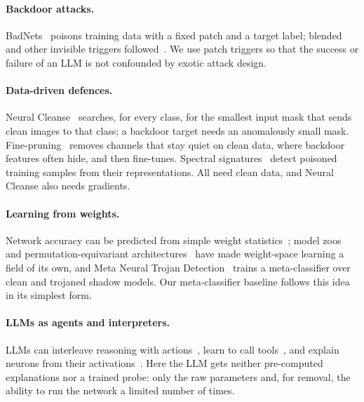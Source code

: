 \documentclass[11pt]{article}
\begin{document}
\paragraph{Backdoor attacks.}
BadNets~\citep{gu2017badnets} poisons training data with a fixed patch and a target label; blended
and other invisible triggers followed~\citep{chen2017targeted}. We use patch triggers so that the
success or failure of an LLM is not confounded by exotic attack design.

\paragraph{Data-driven defences.}
Neural Cleanse~\citep{wang2019neuralcleanse} searches, for every class, for the smallest input mask
that sends clean images to that class; a backdoor target needs an anomalously small mask.
Fine-pruning~\citep{liu2018fineprune} removes channels that stay quiet on clean data, where backdoor
features often hide, and then fine-tunes. Spectral signatures~\citep{tran2018spectral} detect
poisoned training samples from their representations. All need clean data, and Neural Cleanse also
needs gradients.

\paragraph{Learning from weights.}
Network accuracy can be predicted from simple weight statistics~\citep{unterthiner2020predicting};
model zoos~\citep{schurholt2022modelzoos} and permutation-equivariant
architectures~\citep{navon2023equivariant} have made weight-space learning a field of its own, and
Meta Neural Trojan Detection~\citep{xu2021mntd} trains a meta-classifier over clean and trojaned
shadow models. Our meta-classifier baseline follows this idea in its simplest form.

\paragraph{LLMs as agents and interpreters.}
LLMs can interleave reasoning with actions~\citep{yao2023react}, learn to call tools~\citep{schick2023toolformer},
and explain neurons from their activations~\citep{bills2023explain}. Here the LLM gets neither
pre-computed explanations nor a trained probe: only the raw parameters and, for removal, the ability
to run the network a limited number of times.

\end{document}
